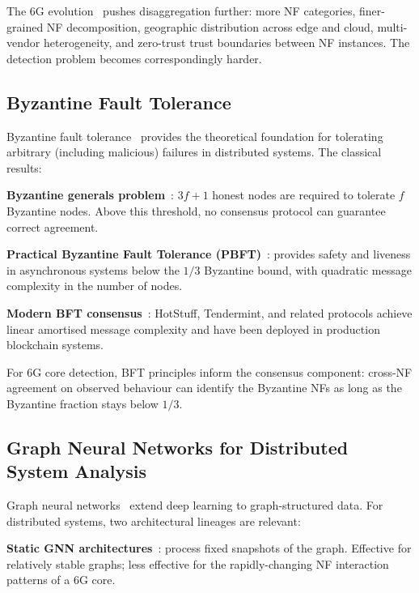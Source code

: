 \documentclass[sigconf,nonacm]{acmart}
\begin{document}
The 6G evolution~\cite{tataria20206g,akhtar20246g} pushes
disaggregation further: more NF categories, finer-grained NF
decomposition, geographic distribution across edge and cloud,
multi-vendor heterogeneity, and zero-trust trust boundaries
between NF instances. The detection problem becomes
correspondingly harder.

\subsection{Byzantine Fault Tolerance}

Byzantine fault tolerance~\cite{lamport1982byzantine,
castro2002pbft} provides the theoretical foundation for tolerating
arbitrary (including malicious) failures in distributed systems.
The classical results:

\textbf{Byzantine generals problem}~\cite{lamport1982byzantine}:
$3f+1$ honest nodes are required to tolerate $f$ Byzantine nodes.
Above this threshold, no consensus protocol can guarantee correct
agreement.

\textbf{Practical Byzantine Fault Tolerance (PBFT)}~\cite{castro2002pbft}:
provides safety and liveness in asynchronous systems below the
$1/3$ Byzantine bound, with quadratic message complexity in the
number of nodes.

\textbf{Modern BFT consensus}~\cite{yin2019hotstuff,buchman2018tendermint}:
HotStuff, Tendermint, and related protocols achieve linear
amortised message complexity and have been deployed in
production blockchain systems.

For 6G core detection, BFT principles inform the consensus
component: cross-NF agreement on observed behaviour can identify
the Byzantine NFs as long as the Byzantine fraction stays below
$1/3$.

\subsection{Graph Neural Networks for Distributed System Analysis}

Graph neural networks~\cite{kipf2017gcn,hamilton2017graphsage}
extend deep learning to graph-structured data. For distributed
systems, two architectural lineages are relevant:

\textbf{Static GNN architectures}~\cite{kipf2017gcn,velickovic2018gat}:
process fixed snapshots of the graph. Effective for
relatively stable graphs; less effective for the rapidly-changing
NF interaction patterns of a 6G core.
\end{document}
